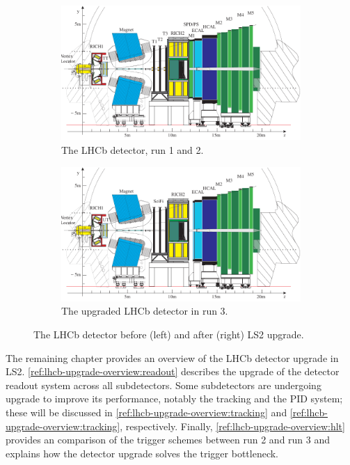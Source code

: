 \begin{figure}[!htb]
    \centering
    \begin{subfigure}[t]{0.45\textwidth}
        \centering
        \includegraphics[width=\textwidth]{./figs-detector/lhcb_detector_view.pdf}
        \caption{The LHCb detector, run 1 and 2.}
    \end{subfigure}
    \hspace{12pt}
    \begin{subfigure}[t]{0.45\textwidth}
        \centering
        \includegraphics[width=\textwidth]{./figs-lhcb-upgrade-overview/lhcb_detector_view_run3.pdf}
        \caption{The upgraded LHCb detector in run 3.}
    \end{subfigure}

    \caption{
        The LHCb detector before (left) and after (right) LS2 upgrade.
    }
    \label{fig:lhcb-detector-comparison}
\end{figure}

The remaining chapter provides an overview of the LHCb detector upgrade in LS2.
\cref{ref:lhcb-upgrade-overview:readout} describes the upgrade of the detector
readout system across all subdetectors.
Some subdetectors are undergoing upgrade to improve its performance, notably
the tracking and the PID system;
these will be discussed in \cref{ref:lhcb-upgrade-overview:tracking} and
\cref{ref:lhcb-upgrade-overview:tracking}, respectively.
Finally,
\cref{ref:lhcb-upgrade-overview:hlt}
provides an comparison of the trigger schemes between run 2 and run 3 and
explains how the detector upgrade solves the trigger bottleneck.


